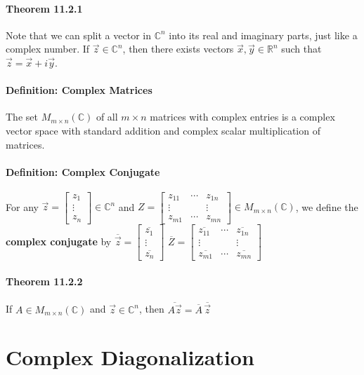 \documentclass[10pt,letter]{article}
\begin{document}
\paragraph{Theorem 11.2.1}
Note that we can split a vector in $\mathbb{C}^n$ into its real and imaginary parts, just like a complex number. If $\vec{z}\in\mathbb{C}^n$, then there exists vectors $\vec{x},\vec{y}\in\mathbb{R}^n$ such that $\vec{z}=\vec{x}+i\vec{y}$.
\paragraph{Definition: Complex Matrices}
The set $M_{m\times n}(\mathbb{C})$ of all $m\times n$ matrices with complex entries is a complex vector space with standard addition and complex scalar multiplication of matrices. 
\paragraph{Definition: Complex Conjugate}
For any $\vec{z}=\begin{bmatrix}z_1\\\vdots\\z_n\end{bmatrix}\in\mathbb{C}^n$ and $Z=\begin{bmatrix}z_{11}&\cdots&z_{1n}\\\vdots&&\vdots\\z_{m1}&\cdots&z_{mn}\end{bmatrix}\in M_{m\times n}(\mathbb{C})$, we define the \textbf{complex conjugate} by $\overline{\vec{z}}=\begin{bmatrix}\overline{z_1}\\\vdots\\\overline{z_n}\end{bmatrix}$ $\overline{Z}=\begin{bmatrix}\overline{z_{11}}&\cdots&\overline{z_{1n}}\\\vdots&&\vdots\\\overline{z_{m1}}&\cdots&\overline{z_{mn}}\end{bmatrix}$
\paragraph{Theorem 11.2.2}
If $A\in M_{m\times n}(\mathbb{C})$ and $\vec{z}\in\mathbb{C}^n$, then $\overline{A\vec{z}}=\overline{A}\,\overline{\vec{z}}$

\section*{Complex Diagonalization}
\end{document}
